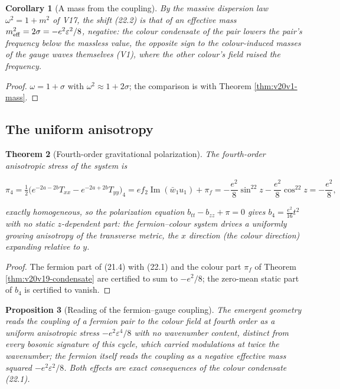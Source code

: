 \documentclass[11pt]{article}
\newtheorem{theorem}{Theorem}[section]
\newtheorem{proposition}[theorem]{Proposition}
\newtheorem{corollary}[theorem]{Corollary}
\theoremstyle{remark}
\begin{document}
\begin{corollary}[A mass from the coupling]
\label{cor:v20v19-mass}
By the massive dispersion law \(\omega^2=1+m^2\) of V17, the shift
(22.2) is that of an effective mass
\(m_{\rm eff}^2=2\sigma=-e^2\varepsilon^2/8\), negative: the colour
condensate of the pair lowers the pair's frequency below the
massless value, the opposite sign to the colour-induced masses of
the gauge waves themselves (V1), where the other colour's field
raised the frequency.
\end{corollary}

\begin{proof}
\(\omega=1+\sigma\) with \(\omega^2\approx1+2\sigma\); the comparison
is with Theorem \ref{thm:v20v1-mass}.
\end{proof}

\subsection{The uniform anisotropy}

\begin{theorem}[Fourth-order gravitational polarization]
\label{thm:v20v19-anisotropy}
The fourth-order anisotropic stress of the system is

\[
 \pi_4=\tfrac12\bigl(e^{-2a-2b}T_{xx}-e^{-2a+2b}T_{yy}\bigr)_4
 =ef_2\operatorname{Im}(\bar w_1u_1)+\pi_f=-\frac{e^2}8\sin^22z-\frac{e^2}8\cos^22z=-\frac{e^2}8,
                                                                    \tag{22.3}
\]

exactly homogeneous, so the polarization equation \(b_{tt}-b_{zz}+\pi=0\)
gives \(b_4=\tfrac{e^2}{16}t^2\) with no static \(z\)-dependent part:
the fermion--colour system drives a uniformly growing anisotropy of
the transverse metric, the \(x\) direction (the colour direction)
expanding relative to \(y\).
\end{theorem}

\begin{proof}
The fermion part of (21.4) with (22.1) and the colour part
\(\pi_f\) of Theorem \ref{thm:v20v19-condensate} are certified to sum
to \(-e^2/8\); the zero-mean static part of \(b_4\) is certified to
vanish.
\end{proof}

\begin{proposition}[Reading of the fermion--gauge coupling]
\label{prop:v20v19-reading}
The emergent geometry reads the coupling of a fermion pair to the
colour field at fourth order as a uniform anisotropic stress
\(-e^2\varepsilon^4/8\) with no wavenumber content, distinct from every
bosonic signature of this cycle, which carried modulations at twice
the wavenumber; the fermion itself reads the coupling as a negative
effective mass squared \(-e^2\varepsilon^2/8\).  Both effects are exact
consequences of the colour condensate (22.1).
\end{proposition}
\end{document}

